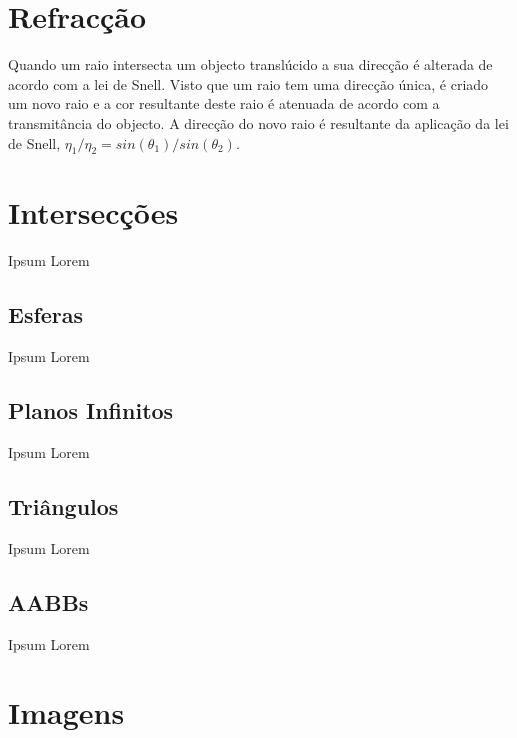 \documentclass{article}
\begin{document}
\begin{multicols}{2}
    \section{Refracção}

    Quando um raio intersecta um objecto translúcido a sua direcção é alterada
    de acordo com a lei de Snell. Visto que um raio tem uma direcção única, é criado
    um novo raio e a cor resultante deste raio é atenuada de acordo com
    a transmitância do objecto. A direcção do novo raio é resultante da aplicação
    da lei de Snell, $\eta_1/\eta_2 = sin(\theta_1)/sin(\theta_2)$.

    \section{Intersecções}

    Ipsum Lorem

    \subsection{Esferas}

    Ipsum Lorem

    \subsection{Planos Infinitos}

    Ipsum Lorem

    \subsection{Triângulos}

    Ipsum Lorem

    \subsection{AABBs}

    Ipsum Lorem

    \end{multicols}

    \newpage
    \section{Imagens}
\end{document}
